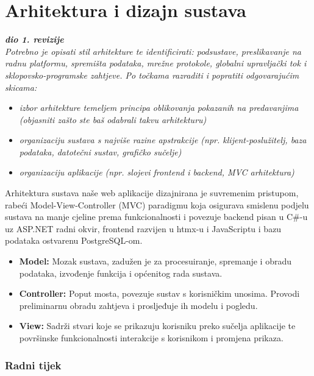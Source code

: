 \chapter{Arhitektura i dizajn sustava}
		
		\textbf{\textit{dio 1. revizije}}\\

		\textit{ Potrebno je opisati stil arhitekture te identificirati: podsustave, preslikavanje na radnu platformu, spremišta podataka, mrežne protokole, globalni upravljački tok i sklopovsko-programske zahtjeve. Po točkama razraditi i popratiti odgovarajućim skicama:}
	\begin{itemize}
		\item 	\textit{izbor arhitekture temeljem principa oblikovanja pokazanih na predavanjima (objasniti zašto ste baš odabrali takvu arhitekturu)}
		\item 	\textit{organizaciju sustava s najviše razine apstrakcije (npr. klijent-poslužitelj, baza podataka, datotečni sustav, grafičko sučelje)}
		\item 	\textit{organizaciju aplikacije (npr. slojevi frontend i backend, MVC arhitektura) }		
	\end{itemize}
	
	
		Arhitektura sustava naše web aplikacije dizajnirana je suvremenim pristupom, rabeći Model-View-Controller (MVC) paradigmu koja osigurava smislenu podjelu sustava na manje cjeline prema funkcionalnosti i povezuje backend pisan u C#-u uz ASP.NET radni okvir, frontend razvijen u htmx-u i JavaScriptu i bazu podataka ostvarenu PostgreSQL-om.


		\begin{itemize}
			\item \textbf{Model:} Mozak sustava, zadužen je za procesuiranje, spremanje i obradu podataka, izvođenje funkcija i općenitog rada sustava. 
			\item \textbf{Controller:} Poput mosta, povezuje sustav s korisničkim unosima. Provodi preliminarnu obradu zahtjeva i prosljeđuje ih modelu i pogledu.
			\item \textbf{View:} Sadrži stvari koje se prikazuju korisniku preko sučelja aplikacije te površinske funkcionalnosti interakcije s korisnikom i promjena prikaza.
		\end{itemize}
		
		\subsection*{Radni tijek}
		
